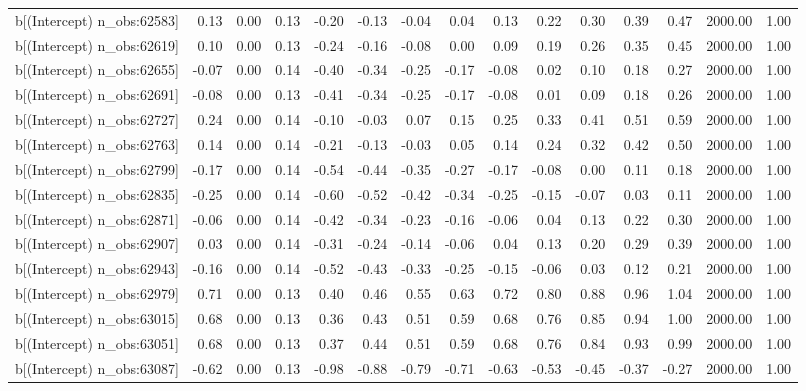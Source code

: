 \begin{table}[ht]
\begin{tabular}{rrrrrrrrrrrrrrr}
  b[(Intercept) n\_obs:62583] & 0.13 & 0.00 & 0.13 & -0.20 & -0.13 & -0.04 & 0.04 & 0.13 & 0.22 & 0.30 & 0.39 & 0.47 & 2000.00 & 1.00 \\ 
  b[(Intercept) n\_obs:62619] & 0.10 & 0.00 & 0.13 & -0.24 & -0.16 & -0.08 & 0.00 & 0.09 & 0.19 & 0.26 & 0.35 & 0.45 & 2000.00 & 1.00 \\ 
  b[(Intercept) n\_obs:62655] & -0.07 & 0.00 & 0.14 & -0.40 & -0.34 & -0.25 & -0.17 & -0.08 & 0.02 & 0.10 & 0.18 & 0.27 & 2000.00 & 1.00 \\ 
  b[(Intercept) n\_obs:62691] & -0.08 & 0.00 & 0.13 & -0.41 & -0.34 & -0.25 & -0.17 & -0.08 & 0.01 & 0.09 & 0.18 & 0.26 & 2000.00 & 1.00 \\ 
  b[(Intercept) n\_obs:62727] & 0.24 & 0.00 & 0.14 & -0.10 & -0.03 & 0.07 & 0.15 & 0.25 & 0.33 & 0.41 & 0.51 & 0.59 & 2000.00 & 1.00 \\ 
  b[(Intercept) n\_obs:62763] & 0.14 & 0.00 & 0.14 & -0.21 & -0.13 & -0.03 & 0.05 & 0.14 & 0.24 & 0.32 & 0.42 & 0.50 & 2000.00 & 1.00 \\ 
  b[(Intercept) n\_obs:62799] & -0.17 & 0.00 & 0.14 & -0.54 & -0.44 & -0.35 & -0.27 & -0.17 & -0.08 & 0.00 & 0.11 & 0.18 & 2000.00 & 1.00 \\ 
  b[(Intercept) n\_obs:62835] & -0.25 & 0.00 & 0.14 & -0.60 & -0.52 & -0.42 & -0.34 & -0.25 & -0.15 & -0.07 & 0.03 & 0.11 & 2000.00 & 1.00 \\ 
  b[(Intercept) n\_obs:62871] & -0.06 & 0.00 & 0.14 & -0.42 & -0.34 & -0.23 & -0.16 & -0.06 & 0.04 & 0.13 & 0.22 & 0.30 & 2000.00 & 1.00 \\ 
  b[(Intercept) n\_obs:62907] & 0.03 & 0.00 & 0.14 & -0.31 & -0.24 & -0.14 & -0.06 & 0.04 & 0.13 & 0.20 & 0.29 & 0.39 & 2000.00 & 1.00 \\ 
  b[(Intercept) n\_obs:62943] & -0.16 & 0.00 & 0.14 & -0.52 & -0.43 & -0.33 & -0.25 & -0.15 & -0.06 & 0.03 & 0.12 & 0.21 & 2000.00 & 1.00 \\ 
  b[(Intercept) n\_obs:62979] & 0.71 & 0.00 & 0.13 & 0.40 & 0.46 & 0.55 & 0.63 & 0.72 & 0.80 & 0.88 & 0.96 & 1.04 & 2000.00 & 1.00 \\ 
  b[(Intercept) n\_obs:63015] & 0.68 & 0.00 & 0.13 & 0.36 & 0.43 & 0.51 & 0.59 & 0.68 & 0.76 & 0.85 & 0.94 & 1.00 & 2000.00 & 1.00 \\ 
  b[(Intercept) n\_obs:63051] & 0.68 & 0.00 & 0.13 & 0.37 & 0.44 & 0.51 & 0.59 & 0.68 & 0.76 & 0.84 & 0.93 & 0.99 & 2000.00 & 1.00 \\ 
  b[(Intercept) n\_obs:63087] & -0.62 & 0.00 & 0.13 & -0.98 & -0.88 & -0.79 & -0.71 & -0.63 & -0.53 & -0.45 & -0.37 & -0.27 & 2000.00 & 1.00 \\ 

\end{tabular}
\end{table}
